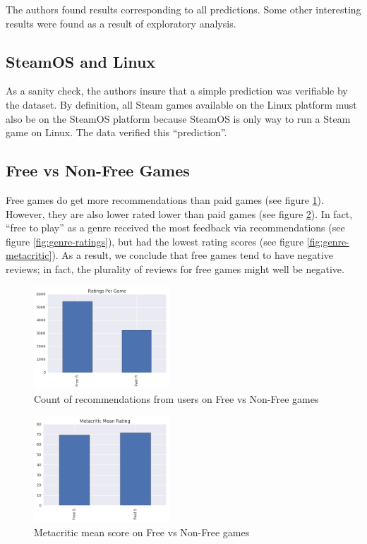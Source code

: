 \documentclass[letterpaper,10pt,twocolumn]{article}
\begin{document}
The authors found results corresponding to all predictions. Some other interesting
results were found as a result of exploratory analysis.

\subsection{SteamOS and Linux}

As a sanity check, the authors insure that a simple prediction was verifiable
by the dataset. By definition, all Steam games available on the Linux platform
must also be on the SteamOS platform because SteamOS is only way to run a Steam
game on Linux. The data verified this ``prediction''.

\subsection{Free vs Non-Free Games}

Free games do get more recommendations than paid games (see figure
\ref{fig:freevnon-ratings}). However, they are also lower rated lower than paid
games (see figure \ref{fig:freevnon-metacritic}). In fact, ``free to play'' as a
genre received the most feedback via recommendations (see figure
\ref{fig:genre-ratings}), but had the lowest rating scores (see figure
\ref{fig:genre-metacritic}). As a result, we conclude that free games tend to
have negative reviews; in fact, the plurality of reviews for free games might
well be negative.

\begin{figure}[h]
    \caption{Count of recommendations from users on Free vs Non-Free games}
    \label{fig:freevnon-ratings}
    \includegraphics[width=0.45\textwidth,keepaspectratio]{freevnon-ratings-bar}
\end{figure}

\begin{figure}[h]
    \caption{Metacritic mean score on Free vs Non-Free games}
    \label{fig:freevnon-metacritic}
    \includegraphics[width=0.45\textwidth,keepaspectratio]{freevnon-metacritic-bar}
\end{figure}
\end{document}
